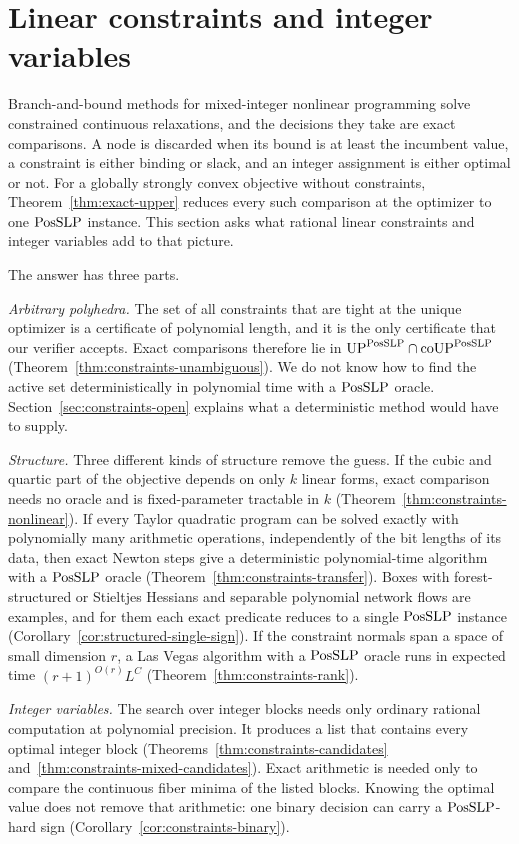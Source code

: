 \section{Linear constraints and integer variables}
\label{sec:constraints}

Branch-and-bound methods for mixed-integer nonlinear programming solve
constrained continuous relaxations, and the decisions they take are exact
comparisons. A node is discarded when its bound is at least the incumbent
value, a constraint is either binding or slack, and an integer assignment is
either optimal or not. For a globally strongly convex objective without
constraints, Theorem~\ref{thm:exact-upper} reduces every such comparison at
the optimizer to one $\mathrm{PosSLP}$ instance. This section asks what rational
linear constraints and integer variables add to that picture.

The answer has three parts.

\emph{Arbitrary polyhedra.} The set of all constraints that are tight at the
unique optimizer is a certificate of polynomial length, and it is the only
certificate that our verifier accepts. Exact comparisons therefore lie in
$\mathrm{UP}^{\mathrm{PosSLP}}\cap\mathrm{coUP}^{\mathrm{PosSLP}}$
(Theorem~\ref{thm:constraints-unambiguous}). We do not know how to find the
active set deterministically in polynomial time with a $\mathrm{PosSLP}$ oracle.
Section~\ref{sec:constraints-open} explains what a deterministic method would
have to supply.

\emph{Structure.} Three different kinds of structure remove the guess. If the
cubic and quartic part of the objective depends on only $k$ linear forms,
exact comparison needs no oracle and is fixed-parameter tractable in $k$
(Theorem~\ref{thm:constraints-nonlinear}). If every Taylor quadratic program
can be solved exactly with polynomially many arithmetic operations,
independently of the bit lengths of its data, then exact Newton steps give a
deterministic polynomial-time algorithm with a $\mathrm{PosSLP}$ oracle
(Theorem~\ref{thm:constraints-transfer}). Boxes with forest-structured or
Stieltjes Hessians and separable polynomial network flows are examples, and
for them each exact predicate reduces to a single $\mathrm{PosSLP}$ instance
(Corollary~\ref{cor:structured-single-sign}). If the constraint normals span a
space of small dimension $r$, a Las Vegas algorithm with a $\mathrm{PosSLP}$ oracle
runs in expected time $(r+1)^{O(r)}L^{C}$
(Theorem~\ref{thm:constraints-rank}).

\emph{Integer variables.} The search over integer blocks needs only ordinary
rational computation at polynomial precision. It produces a list that
contains every optimal integer block
(Theorems~\ref{thm:constraints-candidates}
and~\ref{thm:constraints-mixed-candidates}). Exact arithmetic is needed only
to compare the continuous fiber minima of the listed blocks. Knowing the
optimal value does not remove that arithmetic: one binary decision can carry
a $\mathrm{PosSLP}$-hard sign (Corollary~\ref{cor:constraints-binary}).

